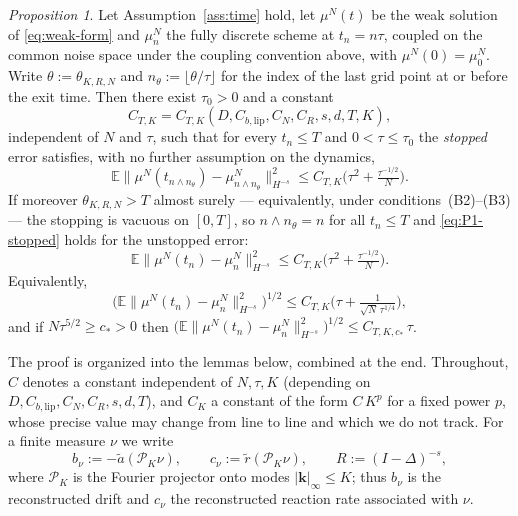 \documentclass[a4paper,fleqn]{cas-sc}
\theoremstyle{definition}
\theoremstyle{remark}
\newtheorem{proposition}{Proposition}
\begin{document}
\begin{proposition}
\label{prop:time_discrete_particle}
Let Assumption~\ref{ass:time} hold, let $\mu^N(t)$ be the weak solution of
\eqref{eq:weak-form} and $\mu^N_n$ the fully discrete scheme at $t_n=n\tau$, coupled on
the common noise space under the coupling convention above, with $\mu^N(0)=\mu^N_0$.
Write $\theta:=\theta_{K,R,N}$ and $n_\theta:=\lfloor\theta/\tau\rfloor$ for the index
of the last grid point at or before the exit time. Then there exist $\tau_0>0$ and a
constant
\[
C_{T,K}=C_{T,K}(D,C_{b,\mathrm{lip}},C_N,C_R,s,d,T,K),
\]
independent of $N$ and $\tau$, such that for every $t_n\le T$ and $0<\tau\le\tau_0$ the
\emph{stopped} error satisfies, with no further assumption on the dynamics,
\begin{equation}\label{eq:P1-stopped}
\mathbb E\big\|\mu^N(t_{n\wedge n_\theta})-\mu^N_{n\wedge n_\theta}\big\|_{H^{-s}}^2
\le C_{T,K}\Big(\tau^2+\tfrac{\tau^{-1/2}}N\Big).
\end{equation}
If moreover $\theta_{K,R,N}>T$ almost surely --- equivalently, under
conditions~(B2)--(B3) --- the stopping is vacuous on $[0,T]$, so $n\wedge n_\theta=n$
for all $t_n\le T$ and \eqref{eq:P1-stopped} holds for the unstopped error:
\begin{equation}\label{eq:P1}
\mathbb E\big\|\mu^N(t_n)-\mu^N_n\big\|_{H^{-s}}^2
\le C_{T,K}\Big(\tau^2+\tfrac{\tau^{-1/2}}N\Big).
\end{equation}
Equivalently,
\begin{equation}\label{eq:P2}
\Big(\mathbb E\big\|\mu^N(t_n)-\mu^N_n\big\|_{H^{-s}}^2\Big)^{1/2}
\le C_{T,K}\Big(\tau+\tfrac1{\sqrt N\,\tau^{1/4}}\Big),
\end{equation}
and if $N\tau^{5/2}\ge c_*>0$ then
$\big(\mathbb E\|\mu^N(t_n)-\mu^N_n\|_{H^{-s}}^2\big)^{1/2}\le C_{T,K,c_*}\,\tau$.
\end{proposition}

The proof is organized into the lemmas below, combined at the end. Throughout,
$C$ denotes a constant independent of $N,\tau,K$ (depending on
$D,C_{b,\mathrm{lip}},C_N,C_R,s,d,T$), and $C_K$ a constant of the form $C\,K^{p}$
for a fixed power $p$, whose precise value may change from line to line and which
we do not track. For a finite measure $\nu$ we write
\[
b_\nu:=-\tilde a(\mathcal P_K\nu),\qquad
c_\nu:=\tilde r(\mathcal P_K\nu),\qquad
R:=(I-\Delta)^{-s},
\]
where $\mathcal P_K$ is the Fourier projector onto modes $|\mathbf k|_\infty\le K$;
thus $b_\nu$ is the reconstructed drift and $c_\nu$ the reconstructed reaction
rate associated with $\nu$.
\end{document}
